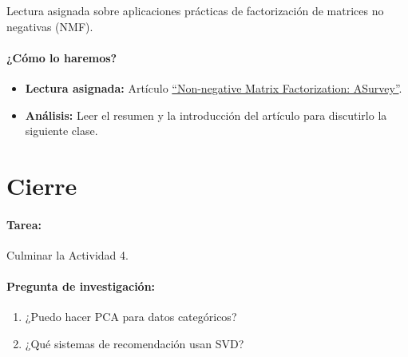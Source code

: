 \documentclass[a4,11pt]{aleph-notas}
\begin{document}
Lectura asignada sobre aplicaciones prácticas de factorización de matrices no negativas (NMF).

\paragraph{¿Cómo lo haremos?}  
\begin{itemize}[leftmargin=*]
    \item \textbf{Lectura asignada:}  
    Artículo \href{https://mro.massey.ac.nz/server/api/core/bitstreams/7dbd6b5e-4d71-490a-b1b6-654e40181693/content}{“Non-negative Matrix Factorization: ASurvey”}.  
    \item \textbf{Análisis:}  
    Leer el resumen y la introducción del artículo para discutirlo la siguiente clase.
\end{itemize}

\section*{Cierre}

\paragraph{Tarea:} Culminar la Actividad 4.
    
    
\paragraph{Pregunta de investigación:} 
\begin{enumerate}
    \item ¿Puedo hacer PCA para datos categóricos?
    \item ¿Qué sistemas de recomendación usan SVD?

\end{enumerate}
    
\end{document}
